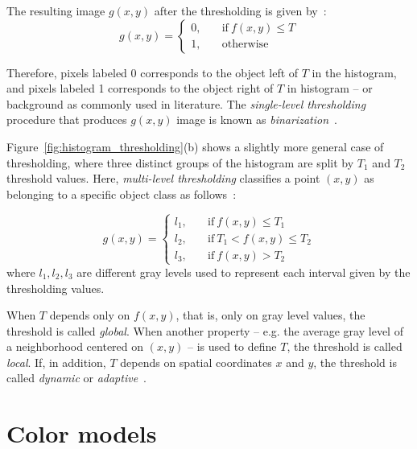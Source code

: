 The resulting image $g(x, y)$ after the thresholding is given by~\citep{gonzalez:02}:
\begin{equation}
g(x, y) =   \begin{cases}
                0, \quad &\text{if}\ f(x, y) \leq T\\[0.7em]
                1, \quad &\text{otherwise}
            \end{cases}
\end{equation}

Therefore, pixels labeled 0 corresponds to the object left of $T$ in the histogram, and pixels labeled 1 corresponds to the object right of $T$ in histogram -- or background as commonly used in literature. The \emph{single-level thresholding} procedure that produces $g(x, y)$ image is known as \emph{binarization}~\citep{gonzalez:02}.

Figure~\ref{fig:histogram_thresholding}(b) shows a slightly more general case of thresholding, where three distinct groups of the histogram are split by $T_1$ and $T_2$ threshold values. Here, \emph{multi-level thresholding} classifies a point $(x, y)$ as belonging to a specific object class as follows~\citep{gonzalez:02}:

\begin{equation}
g(x, y) =   \begin{cases}
                l_1, \quad &\text{if}\ f(x, y) \leq T_1\\[0.7em]
                l_2, \quad &\text{if}\ T_1 < f(x, y) \leq T_2\\[0.7em]
                l_3, \quad &\text{if}\ f(x, y) > T_2
            \end{cases}
\end{equation}
where $l_1, l_2, l_3$ are different gray levels used to represent each interval given by the thresholding values.

When $T$ depends only on $f(x, y)$, that is, only on gray level values, the threshold is called \emph{global}. When another property -- e.g. the average gray level of a neighborhood centered on $(x, y)$ -- is used to define $T$, the threshold is called \emph{local}. If, in addition, $T$ depends on spatial coordinates $x$ and $y$, the threshold is called \emph{dynamic} or \emph{adaptive}~\citep{gonzalez:02}. 


\section{Color models}
\label{sec:color_models}

